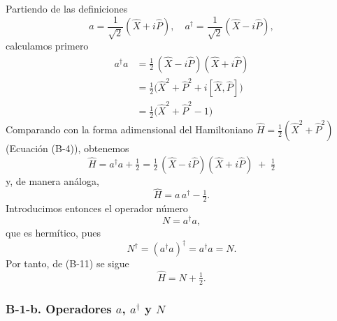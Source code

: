 \documentclass[a4paper,11pt]{article}
\begin{document}
Partiendo de las definiciones
\[
a = \frac{1}{\sqrt2}(\hat X + i\hat P), 
\quad
a^\dagger = \frac{1}{\sqrt2}(\hat X - i\hat P),
\]
calculamos primero
\begin{equation}
\begin{split}
a^\dagger a
&= \tfrac12\,(\hat X - i\hat P)(\hat X + i\hat P)\\
&= \tfrac12\bigl(\hat X^2 + \hat P^2 + i[\hat X,\hat P]\bigr)\\
&= \tfrac12\bigl(\hat X^2 + \hat P^2 -1\bigr)
\end{split}
\tag{B-10}
\end{equation}
Comparando con la forma adimensional del Hamiltoniano
\(\hat H = \tfrac12(\hat X^2 + \hat P^2)\) (Ecuación (B-4)), obtenemos
\begin{equation}
\hat H 
= a^\dagger a + \tfrac12
= \tfrac12\,(\hat X - i\hat P)(\hat X + i\hat P) \;+\;\tfrac12
\tag{B-11}
\end{equation}
y, de manera análoga,
\begin{equation}
\hat H = a\,a^\dagger - \tfrac12.
\tag{B-12}
\end{equation}
Introducimos entonces el operador número
\begin{equation}
N = a^\dagger a,
\tag{B-13}
\end{equation}
que es hermítico, pues
\begin{equation}
N^\dagger = (a^\dagger a)^\dagger = a^\dagger a = N.
\tag{B-14}
\end{equation}
Por tanto, de (B-11) se sigue
\begin{equation}
\hat H = N + \tfrac12.
\tag{B-15}
\end{equation}

\subsubsection*{B-1-b. Operadores \(a\), \(a^\dagger\) y \(N\)}
\end{document}
